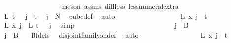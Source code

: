 \begin{isabellebody}
\ \ \ \ \ \ \ \ \ \ \ \ \ \ \ \ \isamarkupfalse%
\ {\isacharparenleft}{\kern0pt}meson\ assms{\isacharparenleft}{\kern0pt}{}{\isacharparenright}{\kern0pt}\ diff{\isacharunderscore}{\kern0pt}less\ less{\isacharunderscore}{\kern0pt}numeral{\isacharunderscore}{\kern0pt}extra{\isacharparenleft}{\kern0pt}{}{\isacharparenright}{\kern0pt}{\isacharparenright}{\kern0pt}\isanewline
\ \ \ \ \ \ \ \ \ \ \ \ \ \ \isamarkupfalse%
\ \isamarkupfalse%
\ {\isachardoublequoteopen}L\ {\isacharparenleft}{\kern0pt}t\ {\isacharminus}{\kern0pt}\ {}{\isacharparenright}{\kern0pt}\ j\ {\isacharless}{\kern0pt}\ t{\isachardoublequoteclose}\ \isamarkupfalse%
\ {\isacartoucheopen}j\ {\isasymin}\ {\isacharbraceleft}{\kern0pt}{\isachardot}{\kern0pt}{\isachardot}{\kern0pt}{\isacharless}{\kern0pt}N{\isacharprime}{\kern0pt}{\isacharbraceright}{\kern0pt}{\isacartoucheclose}\ \isamarkupfalse%
\ cube{\isacharunderscore}{\kern0pt}def\ \isamarkupfalse%
\ auto\ \isanewline
\ \ \ \ \ \ \ \ \ \ \ \ \ \ \isamarkupfalse%
\ \isamarkupfalse%
\ {\isachardoublequoteopen}L{\isacharprime}{\kern0pt}\ x\ j\ {\isasymin}\ {\isacharbraceleft}{\kern0pt}{\isachardot}{\kern0pt}{\isachardot}{\kern0pt}{\isacharless}{\kern0pt}t\ {\isacharplus}{\kern0pt}\ {}{\isacharbraceright}{\kern0pt}{\isachardoublequoteclose}\ \isamarkupfalse%
\ {\isacartoucheopen}L{\isacharprime}{\kern0pt}\ x\ j\ {\isacharequal}{\kern0pt}\ L\ {\isacharparenleft}{\kern0pt}t\ {\isacharminus}{\kern0pt}\ {}{\isacharparenright}{\kern0pt}\ j{\isacartoucheclose}\ \isamarkupfalse%
\ simp\isanewline
\ \ \ \ \ \ \ \ \ \ \ \ \isamarkupfalse%
\isanewline
\ \ \ \ \ \ \ \ \ \ \ \ \ \ \isamarkupfalse%
\ {\isachardoublequoteopen}j\ {\isasymin}\ B\ {}{\isachardoublequoteclose}\isanewline
\ \ \ \ \ \ \ \ \ \ \ \ \ \ \isamarkupfalse%
\ \isamarkupfalse%
\ {\isachardoublequoteopen}j\ {\isasymnotin}\ B\ {}{\isachardoublequoteclose}\ \isamarkupfalse%
\ Bf{\isacharunderscore}{\kern0pt}defs\ \isamarkupfalse%
\ disjoint{\isacharunderscore}{\kern0pt}family{\isacharunderscore}{\kern0pt}on{\isacharunderscore}{\kern0pt}def\ \isamarkupfalse%
\ auto\isanewline
\ \ \ \ \ \ \ \ \ \ \ \ \ \ \isamarkupfalse%
\ \isamarkupfalse%
\ {\isachardoublequoteopen}L{\isacharprime}{\kern0pt}\ x\ j\ {\isacharequal}{\kern0pt}\ t{\isachardoublequoteclose}\ \ \isamarkupfalse%

\end{isabellebody}
